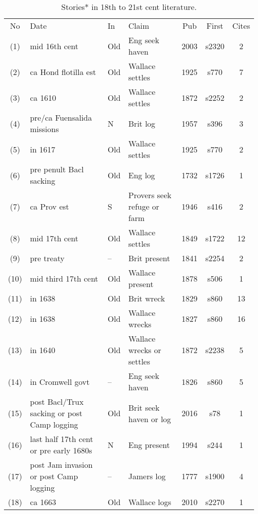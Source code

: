 \begin{table} %
\caption{Stories* in 18th to 21st cent literature.}
\label{tab:literature}
\begin{sideways}
\begin{tabular}{cp{.35\textheight}lp{.2\textheight}ccc}
No	&Date	&In	&Claim	&Pub&First	&Cites\\
(1)	&mid 16th cent	&Old	&Eng seek haven	&2003	&s2320	&2\\ %
(2)	&ca Hond flotilla est	&Old	&Wallace settles	&1925	&s770	&7\\ %
(3)	&ca 1610	&Old&Wallace settles	&1872	&s2252	&2\\ %
(4)	&pre/ca Fuensalida missions	&N	&Brit log	&1957	&s396	&3\\ %
(5)	&in 1617	&Old	&Wallace settles	&1925	&s770	&2\\ %
(6)	&pre penult Bacl sacking	&Old	&Eng log	&1732	&s1726	&1\\ %
(7)	&ca Prov est	&S &Provers seek refuge or farm	&1946	&s416	&2\\ %
(8)	&mid 17th cent	&Old	&Wallace settles	&1849	&s1722	&12\\ %
(9)	&pre treaty	&--	&Brit present	&1841	&s2254	&2\\ %
(10)	&mid third 17th cent	&Old	&Wallace present	&1878	&s506	&1\\ %
(11)	&in 1638	&Old	&Brit wreck	&1829	&s860	&13\\ %
(12)	&in 1638	&Old	&Wallace wrecks	&1827	&s860	&16\\ %
(13)	&in 1640	&Old	&Wallace wrecks or settles	&1872	&s2238	&5\\ %
(14)	&in Cromwell govt	&--	&Eng seek haven	&1826	&s860	&5\\ %
(15)	&post Bacl/Trux sacking or post Camp logging	&Old	&Brit seek haven or log	&2016	&s78	&1\\ %
(16)	&last half 17th cent or pre early 1680s	&N	&Eng present	&1994	&s244	&1\\ %
(17)	&post Jam invasion or post Camp logging	&--	&Jamers log	&1777	&s1900	&4\\ %
(18)	&ca 1663	&Old	&Wallace logs	&2010	&s2270	&1\\ %

\end{tabular}
\end{sideways}
\end{table}
